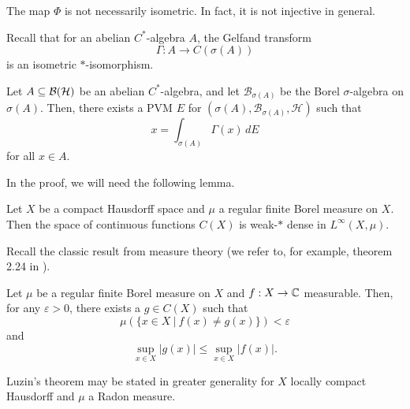 \begin{remark}
  The map $\Phi$ is not necessarily isometric. In fact, it is not injective in general.
\end{remark}

Recall that for an abelian $C^*$-algebra $A$, the Gelfand transform 
$$\Gamma: A \to {C} (\sigma(A))$$
is an isometric $*$-isomorphism.

\begin{theorem}\label{thm:6.1}
  Let $A \subseteq \operatorname{\mathcal{B} (\mathcal{H})}$ be an abelian $C^*$-algebra, and let
  $\mathcal{B}_{\sigma(A)}$ be the Borel $\sigma$-algebra on $\sigma(A)$.
  Then, there exists a PVM $E$ for $(\sigma(A), \mathcal{B}_{\sigma(A)}, \mathcal{H})$ such that 
  $$x = \int_{\sigma(A)} \Gamma (x)\, dE$$
  for all $x \in A$.
\end{theorem}

In the proof, we will need the following lemma.

\begin{lemma}\label{lem:6.1}
  Let $X$ be a compact Hausdorff space and $\mu$ a regular finite Borel measure on $X$. Then 
  the space of continuous functions $C(X)$ is weak-$*$ dense in $L^\infty (X, \mu)$.
\end{lemma}

Recall the classic result from measure theory (we refer to, for example, theorem 2.24 in \cite{rudin}).

\begin{theorem}[Luzin]
  Let $\mu$ be a regular finite Borel measure on $X$ and $f: X \to \mathbb {C}$ measurable.
  Then, for any $\varepsilon > 0$, there exists a $g \in C(X)$ such that 
  $$\mu (\{x \in X\ |\ f(x) \neq g(x)\}) < \varepsilon$$
  and $$\sup_{x \in X} |g(x)| \leq \sup_{x \in X} |f(x)|.$$
\end{theorem}

\begin{remark}
  Luzin's theorem may be stated in greater generality for $X$ locally compact Hausdorff and $\mu$ a Radon measure.
\end{remark}

